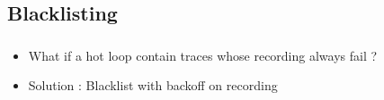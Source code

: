 \documentclass[mathserif,10pt]{beamer}
\newcommand{\cmt}[1]{}
\begin{document}
{
  \frametitle{\subsecname}
  \begin{figure}[h]
  \centering
  \end{figure}
}
\frame
{
  \frametitle{\subsecname}
  \begin{figure}[h]
  \centering
  \end{figure}
}
\subsection{Blacklisting}
\frame
{
  \frametitle{\subsecname}
  \begin{itemize}
   \item What if a hot loop contain traces whose recording always fail ? 
   \item Solution : Blacklist with backoff on recording
   \end{itemize}
}
\cmt{recording overhead is huge.}
\end{document}
